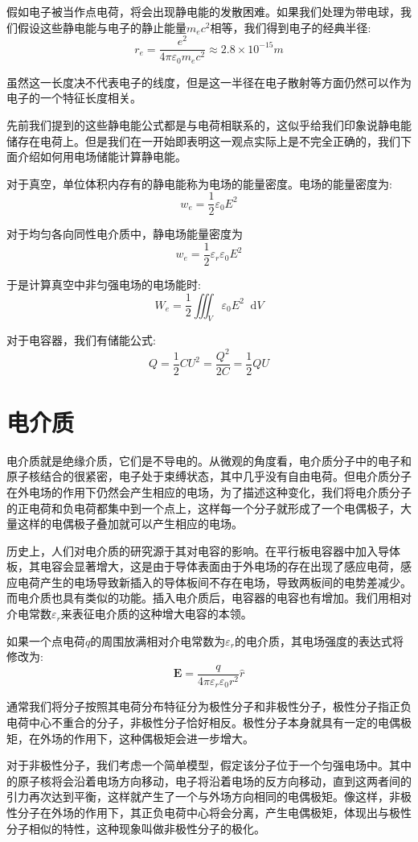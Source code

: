 \documentclass[12pt,a4paper,oneside]{report}
\theoremstyle{definition}
\theoremstyle{remark}
\renewcommand{\d}{\mathop{}\!\mathrm{d}}
\begin{document}
假如电子被当作点电荷，将会出现静电能的发散困难。如果我们处理为带电球，我们假设这些静电能与电子的静止能量$m_ec^2$相等，我们得到电子的经典半径:
\[
r_e=\frac{e^2}{4\pi\varepsilon_0m_e c^2}\approx 2.8\times10^{-15}m
\]
 
虽然这一长度决不代表电子的线度，但是这一半径在电子散射等方面仍然可以作为电子的一个特征长度相关。

先前我们提到的这些静电能公式都是与电荷相联系的，这似乎给我们印象说静电能储存在电荷上。但是我们在一开始即表明这一观点实际上是不完全正确的，我们下面介绍如何用电场储能计算静电能。

对于真空，单位体积内存有的静电能称为电场的能量密度。电场的能量密度为:
\[
w_e=\frac{1}{2}\varepsilon_0E^2
\]

对于均匀各向同性电介质中，静电场能量密度为
\[
w_e=\frac{1}{2}\varepsilon_r\varepsilon_0E^2
\]

于是计算真空中非匀强电场的电场能时:
\[
W_e = \frac{1}{2} \iiint_V \varepsilon_0 E^2 \d V
\]

对于电容器，我们有储能公式:
\[
Q=\frac{1}{2}CU^2 = \frac{Q^2}{2C} = \frac{1}{2}QU
\]

\section{电介质}
电介质就是绝缘介质，它们是不导电的。从微观的角度看，电介质分子中的电子和原子核结合的很紧密，电子处于束缚状态，其中几乎没有自由电荷。但电介质分子在外电场的作用下仍然会产生相应的电场，为了描述这种变化，我们将电介质分子的正电荷和负电荷都集中到一个点上，这样每一个分子就形成了一个电偶极子，大量这样的电偶极子叠加就可以产生相应的电场。

历史上，人们对电介质的研究源于其对电容的影响。在平行板电容器中加入导体板，其电容会显著增大，这是由于导体表面由于外电场的存在出现了感应电荷，感应电荷产生的电场导致新插入的导体板间不存在电场，导致两板间的电势差减少。而电介质也具有类似的功能。插入电介质后，电容器的电容也有增加。我们用相对介电常数$\varepsilon_r$来表征电介质的这种增大电容的本领。

如果一个点电荷$q$的周围放满相对介电常数为$\varepsilon_r$的电介质，其电场强度的表达式将修改为:
\[
\mathbf{E}=\frac{q}{4\pi\varepsilon_r\varepsilon_0r^2}\hat{r}
\]

通常我们将分子按照其电荷分布特征分为极性分子和非极性分子，极性分子指正负电荷中心不重合的分子，非极性分子恰好相反。极性分子本身就具有一定的电偶极矩，在外场的作用下，这种偶极矩会进一步增大。

对于非极性分子，我们考虑一个简单模型，假定该分子位于一个匀强电场中。其中的原子核将会沿着电场方向移动，电子将沿着电场的反方向移动，直到这两者间的引力再次达到平衡，这样就产生了一个与外场方向相同的电偶极矩。像这样，非极性分子在外场的作用下，其正负电荷中心将会分离，产生电偶极矩，体现出与极性分子相似的特性，这种现象叫做非极性分子的极化。
\end{document}
